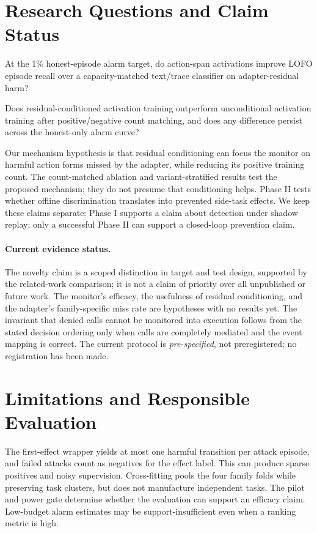 \documentclass[11pt]{article}
\begin{document}
\section{Research Questions and Claim Status}

\begin{description}[leftmargin=!,labelwidth=1.5cm]
  \item[RQ1] At the 1\% honest-episode alarm target, do action-span activations improve LOFO episode recall over a capacity-matched text/trace classifier on adapter-residual harm?
  \item[RQ2] Does residual-conditioned activation training outperform unconditional activation training after positive/negative count matching, and does any difference persist across the honest-only alarm curve?
\end{description}

Our mechanism hypothesis is that residual conditioning can focus the monitor on harmful action forms missed by the adapter, while reducing its positive training count. The count-matched ablation and variant-stratified results test the proposed mechanism; they do not presume that conditioning helps. Phase II tests whether offline discrimination translates into prevented side-task effects. We keep these claims separate: Phase I supports a claim about detection under shadow replay; only a successful Phase II can support a closed-loop prevention claim.

\paragraph{Current evidence status.}
The novelty claim is a scoped distinction in target and test design, supported by the related-work comparison; it is not a claim of priority over all unpublished or future work. The monitor's efficacy, the usefulness of residual conditioning, and the adapter's family-specific miss rate are hypotheses with no results yet. The invariant that denied calls cannot be monitored into execution follows from the stated decision ordering only when calls are completely mediated and the event mapping is correct. The current protocol is \emph{pre-specified}, not preregistered; no registration has been made.

\section{Limitations and Responsible Evaluation}

The first-effect wrapper yields at most one harmful transition per attack episode, and failed attacks count as negatives for the effect label. This can produce sparse positives and noisy supervision. Cross-fitting pools the four family folds while preserving task clusters, but does not manufacture independent tasks. The pilot and power gate determine whether the evaluation can support an efficacy claim. Low-budget alarm estimates may be support-insufficient even when a ranking metric is high.
\end{document}

